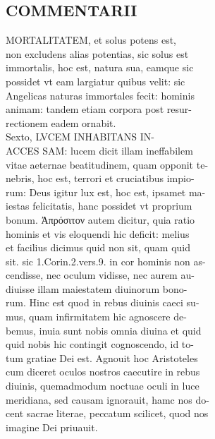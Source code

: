 \documentclass{article}
\begin{document}
\begin{pages}
\section*{COMMENTARII \\
                }
MORTALITATEM, et solus potens est, \\
                non excludens alias potentias, sic solus est \\
                immortalis, hoc est, natura sua, eamque sic \\
                possidet vt eam largiatur quibus velit: sic \\
                Angelicas naturas immortales fecit: hominis \\
                animam: tandem etiam corpora post resur- \\
                rectionem eadem ornabit. \\
                Sexto, LVCEM INHABITANS IN- \\
                ACCES SAM: lucem dicit illam ineffabilem \\
                vitae aeternae beatitudinem, quam opponit te- \\
                nebris, hoc est, terrori et cruciatibus impio- \\
                rum: Deus igitur lux est, hoc est, ipsamet ma- \\
                iestas felicitatis, hanc possidet vt proprium \\
                bonum. Ἀπρόσιτον autem dicitur, quia ratio \\
                hominis et vis eloquendi hic deficit: melius \\
                et facilius dicimus quid non sit, quam quid \\
                sit. sic 1.Corin.2.vers.9. in cor hominis non as- \\
                cendisse, nec oculum vidisse, nec aurem au- \\
                diuisse illam maiestatem diuinorum bono- \\
                rum. Hinc est quod in rebus diuinis caeci su- \\
                mus, quam infirmitatem hic agnoscere de- \\
                bemus, inuia sunt nobis omnia diuina et quid \\
                quid nobis hic contingit cognoscendo, id to- \\
                tum gratiae Dei est. Agnouit hoc Aristoteles \\
                cum diceret oculos nostros caecutire in rebus \\
                diuinis, quemadmodum noctuae oculi in luce \\
                meridiana, sed causam ignorauit, hamc nos do- \\
                cent sacrae literae, peccatum scilicet, quod nos \\
                imagine Dei priuauit. \\
                

\end{pages}
\end{document}
